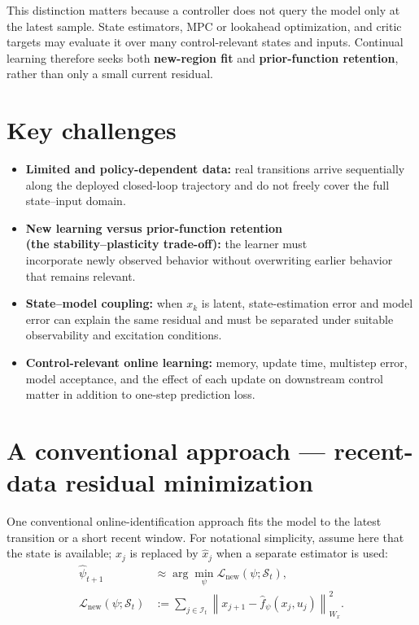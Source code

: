 \documentclass[a4paper]{article}
\begin{document}
This distinction matters because a controller does not query the model only at
the latest sample. State estimators, MPC or lookahead optimization, and critic
targets may evaluate it over many control-relevant states and inputs.
Continual learning therefore seeks both \textbf{new-region fit} and
\textbf{prior-function retention}, rather than only a small current residual.

\section{Key challenges}

\begin{itemize}
  \item \textbf{Limited and policy-dependent data:} real transitions arrive
  sequentially along the deployed closed-loop trajectory and do not freely
  cover the full state--input domain.
  \item \textbf{New learning versus prior-function retention}\\
  \textbf{(the stability--plasticity trade-off):} the learner must\\
  incorporate newly observed behavior without overwriting earlier behavior that
  remains relevant.
  \item \textbf{State--model coupling:} when $x_k$ is latent, state-estimation
  error and model error can explain the same residual and must be separated
  under suitable observability and excitation conditions.
  \item \textbf{Control-relevant online learning:} memory, update time,
  multistep error, model acceptance, and the effect of each update on
  downstream control matter in addition to one-step prediction loss.
\end{itemize}

\section{A conventional approach — recent-data residual minimization}

One conventional online-identification approach fits the model to the latest
transition or a short recent window. For notational simplicity, assume here
that the state is available; $x_j$ is replaced by $\widehat x_j$ when a
separate estimator is used:
\begin{equation}
  \begin{aligned}
  \widehat\psi_{t+1}
  &\approx
  \arg\min_{\psi}
  \mathcal L_{\mathrm{new}}(\psi;\mathcal S_t),\\
  \mathcal L_{\mathrm{new}}(\psi;\mathcal S_t)
  &:=
  \sum_{j\in\mathcal I_t}
  \left\|
  x_{j+1}-\widehat f_{\psi}(x_j,u_j)
  \right\|_{W_x}^{2}.
  \end{aligned}
\end{equation}
\end{document}
